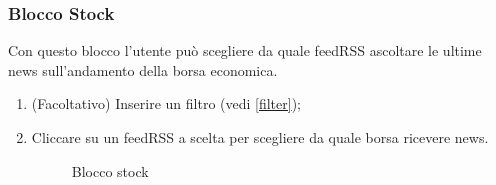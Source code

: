 \subsubsection{Blocco Stock}
Con questo blocco l'utente può scegliere da quale feedRSS ascoltare le ultime news sull'andamento della borsa economica.
\begin{enumerate}
	\item (Facoltativo) Inserire un filtro (vedi \ref{filter});
	\item Cliccare su un feedRSS a scelta per scegliere da quale borsa ricevere news.
	\begin{figure}[!ht]
		\centering
		\caption{Blocco stock}
	\end{figure}
\end{enumerate}
\newpage
